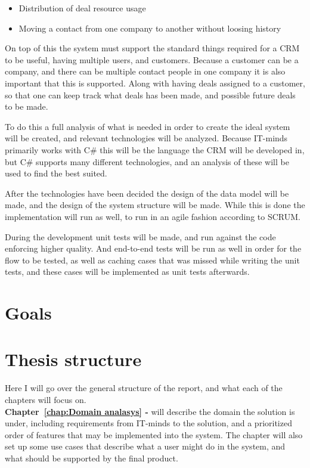 \begin{itemize}
  \item Distribution of deal resource usage
  \item Moving a contact from one company to another without loosing history
\end{itemize}

On top of this the system must support the standard things required for a CRM to be useful,
having multiple users, and customers. Because a customer can be a company, and
there can be multiple contact people in one company it is also important that this
is supported. Along with having deals assigned to a customer, so that one can keep track
what deals has been made, and possible future deals to be made.

To do this a full analysis of what is needed in order to create the ideal system
will be created, and relevant technologies will be analyzed. Because IT-minds primarily
works with C\# this will be the language the CRM will be developed in, but C\# supports
many different technologies, and an analysis of these will be used to find the best suited.

After the technologies have been decided the design of the data model will be made, and the design of the system structure will be made. While this is done the implementation will run as well, to run in an agile fashion according to SCRUM.

During the development unit tests will be made, and run against the code enforcing higher quality.
And end-to-end tests will be run as well in order for the flow to be tested, as well as caching cases that was missed while writing the unit tests, and these cases will be implemented as unit tests afterwards.

\section{Goals}
\label{sec:Goals}


\section{Thesis structure}
\label{sec:Thesis structure}
Here I will go over the general structure of the report, and what each of the chapters will focus on.\\

\textbf{Chapter~\ref{chap:Domain analasys} - } will describe the domain the solution is under, including requirements from IT-minds to the solution, and a prioritized order of features that may be implemented into the system. The chapter will also set up some use cases that describe what a user might do in the system, and what should be supported by the final product.\\

